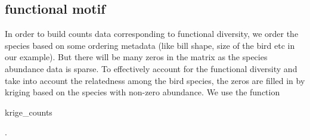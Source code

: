 \documentclass[12pt]{article}
\begin{document}
\begin{knitrout}
\color{fgcolor}\begin{kframe}
\begin{alltt}
 \hlkwb{<-} 
\end{alltt}
\end{kframe}
\end{knitrout}

\begin{knitrout}
\color{fgcolor}\begin{kframe}
\begin{alltt}

\hlstd{regional_counts[}\hlopt{:}\hlstd{,}\hlopt{:}\hlstd{]}
\end{alltt}
\end{kframe}
\end{knitrout}


\subsection{functional motif}

In order to build counts data corresponding to functional diversity, we order the species based on some ordering metadata (like bill shape, size of the bird etc in our example). But there will be many zeros in the matrix as the species abundance data is sparse. To effectively account for the functional diversity and take into account the relatedness among the bird species, the zeros are filled in by kriging based on the species with non-zero abundance. We use the function \begin{verb} krige_counts \end{verb}.

\begin{knitrout}
\color{fgcolor}\begin{kframe}
\begin{alltt}
 \hlkwb{<-} 
         \hlopt{$}
             \hlstd{=} \hlstd{(} \hlstd{=} \hlstd{,} \hlstd{=}\hlstd{,} \hlstd{=}\hlstd{))}
\end{alltt}
\end{kframe}
\end{knitrout}
\end{document}
